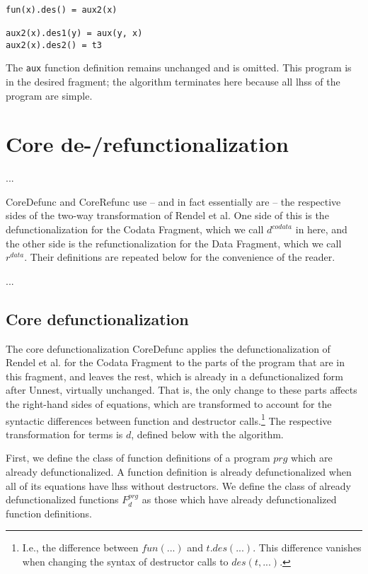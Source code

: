 \begin{lstlisting}

fun(x).des() = aux2(x)

aux2(x).des1(y) = aux(y, x)
aux2(x).des2() = t3

\end{lstlisting}

The \texttt{aux} function definition remains unchanged and is omitted. This program is in the desired fragment; the algorithm terminates here because all lhss of the program are simple.

\section{Core de-/refunctionalization}
\label{sec:coredr}

...

\textsf{CoreDefunc} and \textsf{CoreRefunc} use -- and in fact essentially are -- the respective sides of the two-way transformation of Rendel et al. One side of this is the defunctionalization for the Codata Fragment, which we call $d^{codata}$ in here, and the other side is the refunctionalization for the Data Fragment, which we call $r^{data}$. Their definitions are repeated below for the convenience of the reader.

...

\subsection{Core defunctionalization}

The core defunctionalization \textsf{CoreDefunc} applies the defunctionalization of Rendel et al. for the Codata Fragment to the parts of the program that are in this fragment, and leaves the rest, which is already in a defunctionalized form after \textsf{Unnest}, virtually unchanged. That is, the only change to these parts affects the right-hand sides of equations, which are transformed to account for the syntactic differences between function and destructor calls.\footnote{I.e., the difference between $fun(...)$ and $t.des(...)$. This difference vanishes when changing the syntax of destructor calls to $des(t, ...)$.} The respective transformation for terms is $d$, defined below with the algorithm.

First, we define the class of function definitions of a program $prg$ which are already defunctionalized. A function definition is already defunctionalized when all of its equations have lhss without destructors. We define the class of already defunctionalized functions $F^{prg}_d$ as those which have already defunctionalized function definitions.


